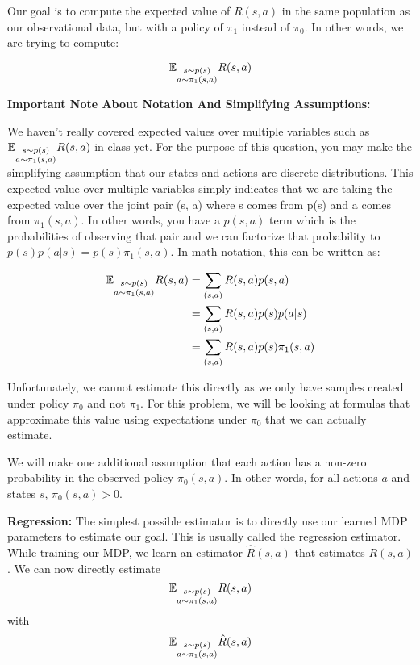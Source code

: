 Our goal is to compute the expected value of $R(s, a)$ in the same population as our observational data, but with a policy of $\pi_1$ instead of $\pi_0$. In other words, we are trying to compute:

$$\mathbb{E}_{\substack{s\sim p(s) \\ a \sim \pi_1(s, a)}} R(s, a)$$

\textbf{Important Note About Notation And Simplifying Assumptions:}  

We haven't really covered expected values over multiple variables such as $\mathbb{E}_{\substack{s\sim p(s) \\ a \sim \pi_1(s, a)}} R(s, a)$ in class yet. For the purpose of this question, you may make the simplifying assumption that our states and actions are discrete distributions. This expected value over multiple variables simply indicates that we are taking the expected value over the joint pair (s, a) where s comes from p(s) and a comes from $\pi_1(s, a)$. In other words, you have a $p(s, a)$ term which is the probabilities of observing that pair and we can factorize that probability to $p(s) p(a|s) = p(s) \pi_1(s, a)$. In math notation, this can be written as:

\begin{align*}
\mathbb{E}_{\substack{s\sim p(s) \\ a \sim \pi_1(s, a)}} R(s, a) &= \sum_{(s, a)} R(s, a) p(s, a) \\
&= \sum_{(s, a)} R(s, a) p(s) p(a | s) \\
&= \sum_{(s, a)} R(s, a) p(s) \pi_1(s, a)
\end{align*}



Unfortunately, we cannot estimate this directly as we only have samples created under policy $\pi_0$ and not $\pi_1$. For this problem, we will be looking at formulas that approximate this value using expectations under $\pi_0$ that we can actually estimate.

We will make one additional assumption that each action has a non-zero probability in the observed policy $\pi_0(s, a)$. In other words, for all actions $a$ and states $s$, $\pi_0(s, a) > 0$.

 \textbf{Regression:} The simplest possible estimator is to directly use our learned MDP parameters to estimate our goal. This is usually called the regression estimator. While training our MDP, we learn an estimator $\hat{R}(s, a)$ that estimates $R(s, a)$. We can now directly estimate $$\mathbb{E}_{\substack{s\sim p(s) \\ a \sim \pi_1(s, a)}} R(s, a)$$ with $$\mathbb{E}_{\substack{s \sim p(s) \\ a \sim \pi_1(s, a)}} \hat{R}(s, a)$$
 
